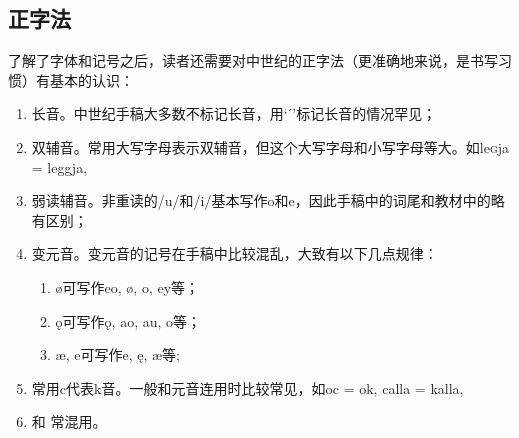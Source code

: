\subsection{正字法}
了解了字体和记号之后，读者还需要对中世纪的正字法（更准确地来说，是书写习惯）有基本的认识：
\begin{info}
    \begin{enumerate}[leftmargin=*]
        \item 长音。中世纪手稿大多数不标记长音，用`ˊ'标记长音的情况罕见；

        \item 双辅音。常用大写字母表示双辅音，但这个大写字母和小写字母等大。如le\textsc{g}ja = leggja,

        \item 弱读辅音。非重读的/u/和/i/基本写作o和e，因此手稿中的词尾和教材中的略有区别；

        \item 变元音。变元音的记号在手稿中比较混乱，大致有以下几点规律：
              \begin{enumerate}
                  \item ø可写作eo, ø, o, ey等；
                  \item ǫ可写作ǫ, ao, au, o等；
                  \item æ, e可写作e, ę, æ等;
              \end{enumerate}

        \item 常用c代表k音。一般和元音连用时比较常见，如oc = ok, calla = kalla,

        \item \th 和 \dh 常混用。
    \end{enumerate}
\end{info}


